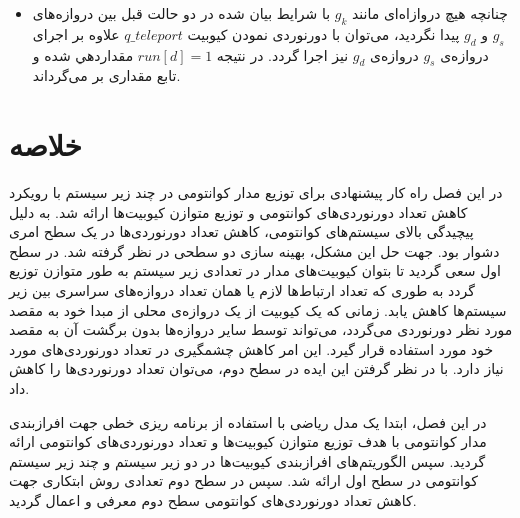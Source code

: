 \begin{itemize}
\begin{figure}[htbp]
{
}

\end{figure}
\item

چنانچه هیچ درواز‌اه‌ای مانند $g_k$ با شرایط بیان شده در دو حالت قبل بین دروازه‌های $g_s$ و $g_d$ پیدا نگردید، می‌توان با دورنوردی نمودن کیوبیت $q\_{teleport}$ علاوه بر اجرای دروازه‌ی $g_s$ دروازه‌ی $g_d$ نیز اجرا گردد. در نتیجه $run[d]=1$ مقداردهي شده و تابع مقداری  بر می‌گرداند.
\end{itemize}

\section{خلاصه}
در این فصل راه کار پیشنهادی برای توزیع مدار کوانتومی در چند زیر سیستم با رویکرد کاهش تعداد دورنوردی‌های کوانتومی و توزیع متوازن کیوبیت‌ها ارائه شد. به دلیل پیچیدگی بالای سیستم‌های کوانتومی، کاهش تعداد دورنوردی‌ها در یک سطح امری دشوار بود. جهت حل این مشکل، بهینه سازی دو سطحی در نظر گرفته شد. در سطح اول سعی گردید تا بتوان کیوبیت‌های مدار در تعدادی زیر سیستم به طور متوازن توزیع گردد به طوری که تعداد ارتباط‌ها لازم یا همان تعداد دروازه‌های سراسری بین زیر سیستم‌ها کاهش یابد. زمانی که یک کیوبیت از یک دروازه‌ی محلی از مبدا خود به مقصد مورد نظر دورنوردی می‌گردد، می‌تواند توسط سایر دروازه‌ها بدون برگشت آن به مقصد خود مورد استفاده قرار گیرد. این امر کاهش چشمگیری در  تعداد دورنوردی‌های مورد نیاز دارد. با در نظر گرفتن این ایده در سطح دوم، می‌توان تعداد دورنوردی‌ها را کاهش داد.

در این فصل، ابتدا یک مدل ریاضی با استفاده از برنامه ریزی خطی جهت افرازبندی مدار کوانتومی با هدف توزیع متوازن کیوبیت‌ها و تعداد دورنوردی‌های کوانتومی ارائه گردید. سپس الگوریتم‌های افرازبندی کیوبیت‌ها در دو زیر سیستم و چند زیر سیستم کوانتومی در سطح اول ارائه شد. سپس در سطح دوم تعدادی روش ابتکاری جهت کاهش تعداد دورنوردی‌های کوانتومی سطح دوم معرفی و اعمال گردید. 